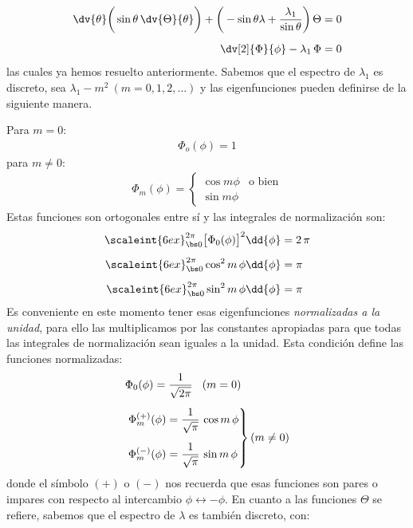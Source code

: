 \begin{align*}
\dv{\theta} \bigg( \sin \theta \, \dv{\Theta}{\theta} \bigg) + \bigg( - \sin \theta \lambda + \dfrac{\lambda_{1}}{\sin \theta} \bigg) \, \Theta &= 0 \\[0.5em]
\dv[2]{\Phi}{\phi} - \lambda_{1} \, \Phi &= 0
\end{align*}
las cuales ya hemos resuelto anteriormente. Sabemos que el espectro de $\lambda_{1}$ es discreto, sea $\lambda_{1}  - m^{2} ~ (m = 0, 1, 2, \ldots)$ y las eigenfunciones pueden definirse de la siguiente manera.
\par
\noindent
Para $m = 0$:
\begin{align*}
\Phi_{o} (\phi) = 1
\end{align*}
para $m \neq 0$:
\begin{align*}
\Phi_{m} (\phi) = \begin{cases}
\cos m \phi & \mbox{o bien} \\
\sin m \phi
\end{cases}
\end{align*}
Estas funciones son ortogonales entre sí y las integrales de normalización son:
\begin{align*}
\scaleint{6ex}_{\bs 0}^{2 \pi} \big[ \Phi_{0} (\phi) \big]^{2} \dd{\phi} &= 2 \, \pi \\[0.5em]
\scaleint{6ex}_{\bs 0}^{2 \pi} \cos^{2} m \, \phi \dd{\phi} &= \pi \\[0.5em]
\scaleint{6ex}_{\bs 0}^{2 \pi} \sin^{2} m \, \phi \dd{\phi} &= \pi
\end{align*}
Es conveniente en este momento tener esas eigenfunciones \emph{normalizadas a la unidad}, para ello las multiplicamos por las constantes apropiadas para que todas las integrales de normalización sean iguales a la unidad. Esta condición define las funciones normalizadas:
\begin{align*}
&\Phi_{0} (\phi) = \dfrac{1}{\sqrt{2 \pi}} \hspace{0.3cm} (m = 0) \\[0.5em]
&\left. \begin{aligned}
\Phi_{m}^{(+)} (\phi) &= \dfrac{1}{\sqrt{\pi}} \, \cos m \, \phi \\[0.5em]
\Phi_{m}^{(-)} (\phi) &= \dfrac{1}{\sqrt{\pi}} \, \sin m \, \phi
\end{aligned} \right\}
(m \neq 0)
\end{align*}
donde el símbolo $(+)$ o $(-)$ nos recuerda que esas funciones son pares o impares con respecto al intercambio $\phi \leftrightarrow - \phi$. En cuanto a las funciones $\Theta$ se refiere, sabemos que el espectro de $\lambda$ es también discreto, con:
